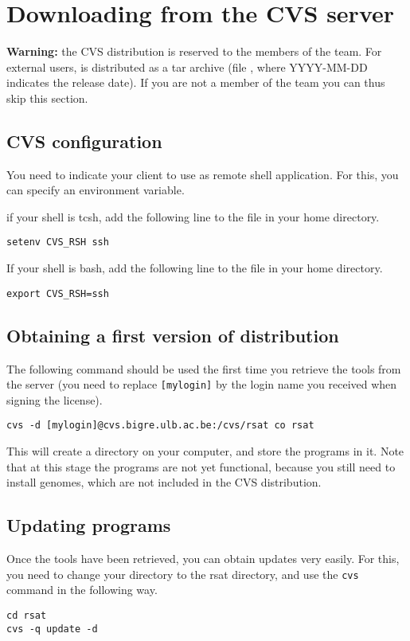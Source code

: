 \section{Downloading \RSAT from the CVS server}

\textbf{Warning:} the CVS distribution is reserved to the members of
the \RSAT team. For external users, \RSAT is distributed as a tar
archive (file , where YYYY-MM-DD
indicates the release date). If you are not a member of the \RSAT team
you can thus skip this section.

\subsection{CVS configuration}

You need to indicate your  client to use 
as remote shell application. For this, you can specify an environment
variable.

if your shell is tcsh, add the following line to the 
file in your home directory.

\begin{lstlisting}
setenv CVS_RSH ssh
\end{lstlisting}


If your shell is bash, add the following line to the 
file in your home directory.

\begin{lstlisting}
export CVS_RSH=ssh
\end{lstlisting}

\subsection{Obtaining a first version of \RSAT distribution}

The following command should be used the first time you retrieve the
tools from the server (you need to replace \texttt{[mylogin]} by the
login name you received when signing the \RSAT license).

\begin{lstlisting}
cvs -d [mylogin]@cvs.bigre.ulb.ac.be:/cvs/rsat co rsat
\end{lstlisting}


This will create a directory  on your computer, and
store the programs in it. Note that at this stage the programs are not
yet functional, because you still need to install genomes, which are
not included in the CVS distribution.

\subsection{Updating \RSAT programs}

Once the tools have been retrieved, you can obtain updates very
easily. For this, you need to change your directory to the rsat
directory, and use the \texttt{cvs} command in the following way.

\begin{lstlisting}
cd rsat
cvs -q update -d
\end{lstlisting}


